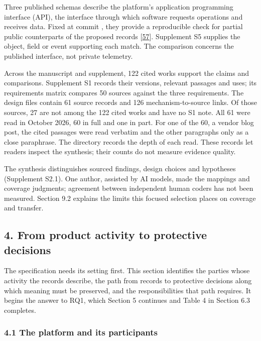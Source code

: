 \documentclass[
  11pt,
]{article}
\begin{document}
Three published schemas describe the platform's application programming
interface (API), the interface through which software requests
operations and receives data. Fixed at commit
\texttt{}, they
provide a reproducible check for partial public counterparts of the
proposed records {[}\protect\hyperlink{ref-StripeOpenAPI2026}{57}{]}.
Supplement S5 supplies the object, field or event supporting each match.
The comparison concerns the published interface, not private telemetry.

Across the manuscript and supplement, 122 cited works support the claims
and comparisons. Supplement S1 records their versions, relevant passages
and uses; its requirements matrix compares 50 sources against the three
requirements. The design files contain 61 source records and 126
mechanism-to-source links. Of those sources, 27 are not among the 122
cited works and have no S1 note. All 61 were read in October 2026, 60 in
full and one in part. For one of the 60, a vendor blog post, the cited
passages were read verbatim and the other paragraphs only as a close
paraphrase. The directory records the depth of each read. These records
let readers inspect the synthesis; their counts do not measure evidence
quality.

The synthesis distinguishes sourced findings, design choices and
hypotheses (Supplement S2.1). One author, assisted by AI models, made
the mappings and coverage judgments; agreement between independent human
coders has not been measured. Section 9.2 explains the limits this
focused selection places on coverage and transfer.

\FloatBarrier

\hypertarget{from-product-activity-to-protective-decisions}{%
\subsection{4. From product activity to protective
decisions}\label{from-product-activity-to-protective-decisions}}

\suppressfloats[t]

The specification needs its setting first. This section identifies the
parties whose activity the records describe, the path from records to
protective decisions along which meaning must be preserved, and the
responsibilities that path requires. It begins the answer to RQ1, which
Section 5 continues and Table 4 in Section 6.3 completes.

\hypertarget{the-platform-and-its-participants}{%
\subsubsection{4.1 The platform and its
participants}\label{the-platform-and-its-participants}}
\end{document}
